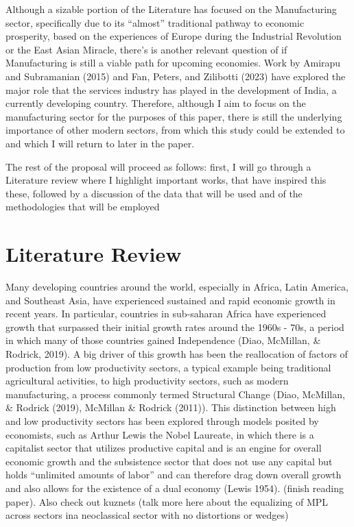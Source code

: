 \documentclass[
  12pt,
  letterpaper,
  DIV=11,
  numbers=noendperiod]{scrartcl}
\begin{document}
Although a sizable portion of the Literature has focused on the
Manufacturing sector, specifically due to its ``almost'' traditional
pathway to economic prosperity, based on the experiences of Europe
during the Industrial Revolution or the East Asian Miracle, there's is
another relevant question of if Manufacturing is still a viable path for
upcoming economies. Work by Amirapu and Subramanian (2015) and Fan,
Peters, and Zilibotti (2023) have explored the major role that the
services industry has played in the development of India, a currently
developing country. Therefore, although I aim to focus on the
manufacturing sector for the purposes of this paper, there is still the
underlying importance of other modern sectors, from which this study
could be extended to and which I will return to later in the paper.

The rest of the proposal will proceed as follows: first, I will go
through a Literature review where I highlight important works, that have
inspired this these, followed by a discussion of the data that will be
used and of the methodologies that will be employed

\hypertarget{literature-review}{%
\section{Literature Review}\label{literature-review}}

Many developing countries around the world, especially in Africa, Latin
America, and Southeast Asia, have experienced sustained and rapid
economic growth in recent years. In particular, countries in sub-saharan
Africa have experienced growth that surpassed their initial growth rates
around the 1960s - 70s, a period in which many of those countries gained
Independence (Diao, McMillan, \& Rodrick, 2019). A big driver of this
growth has been the reallocation of factors of production from low
productivity sectors, a typical example being traditional agricultural
activities, to high productivity sectors, such as modern manufacturing,
a process commonly termed Structural Change (Diao, McMillan, \& Rodrick
(2019), McMillan \& Rodrick (2011)). This distinction between high and
low productivity sectors has been explored through models posited by
economists, such as Arthur Lewis the Nobel Laureate, in which there is a
capitalist sector that utilizes productive capital and is an engine for
overall economic growth and the subsistence sector that does not use any
capital but holds ``unlimited amounts of labor'' and can therefore drag
down overall growth and also allows for the existence of a dual economy
(Lewis 1954). (finish reading paper). Also check out kuznets (talk more
here about the equalizing of MPL across sectors ina neoclassical sector
with no distortions or wedges)
\end{document}
